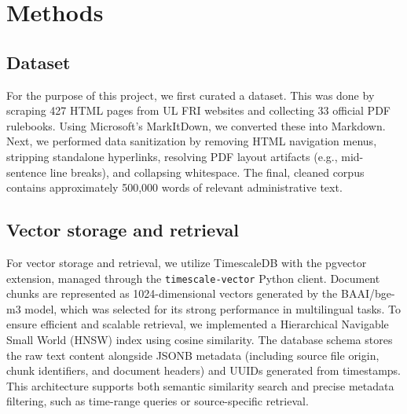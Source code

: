 \documentclass[fleqn,moreauthors,10pt]{ds_report}
\begin{document}
\section*{Methods}

\subsection*{Dataset}
For the purpose of this project, we first curated a dataset. This was done by scraping 427 HTML pages from UL FRI websites and collecting 33 official PDF rulebooks.
Using Microsoft's MarkItDown, we converted these into Markdown. Next, we performed data sanitization by removing HTML navigation menus, stripping standalone hyperlinks, resolving PDF layout artifacts (e.g., mid-sentence line breaks), and collapsing whitespace.
The final, cleaned corpus contains approximately 500,000 words of relevant administrative text.

\subsection*{Vector storage and retrieval}
For vector storage and retrieval, we utilize TimescaleDB with the pgvector extension, managed through the \texttt{timescale-\allowbreak vector} Python client.
Document chunks are represented as 1024-dimensional vectors generated by the BAAI/bge-m3\cite{baai3} model, which was selected for its strong performance in multilingual tasks.
To ensure efficient and scalable retrieval, we implemented a Hierarchical Navigable Small World (HNSW)\cite{hmsw} index using cosine similarity.
The database schema stores the raw text content alongside JSONB metadata (including source file origin, chunk identifiers, and document headers) and UUIDs generated from timestamps.
This architecture supports both semantic similarity search and precise metadata filtering, such as time-range queries or source-specific retrieval.
\end{document}
